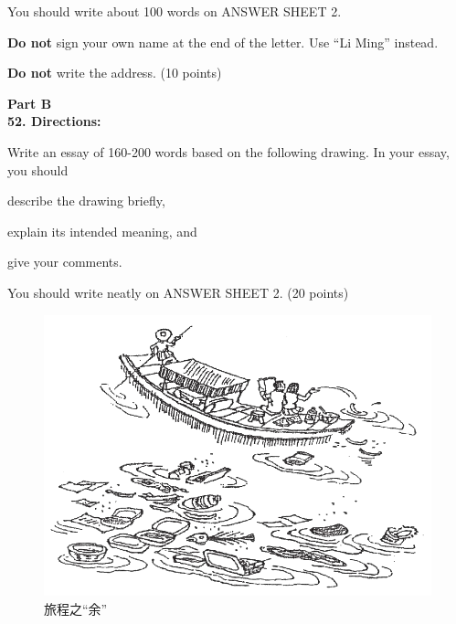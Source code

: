You should write about 100 words on ANSWER SHEET 2.

\textbf{Do not} sign your own name at the end of the letter. Use ``Li
Ming'' instead.

\textbf{Do not} write the address. (10 points)



\vspace{2em}

\noindent
\textbf{Part B}\\
\textbf{52. Directions:}

Write an essay of 160-200 words based on the following drawing. In your
essay, you should
\begin{listwrite}
	\item
 describe the drawing briefly,

\item 
 explain its intended meaning, and

\item 
 give your comments.
\end{listwrite}

You should write neatly on ANSWER SHEET 2. (20 points)

\begin{figure}[h!]
	\centering
	\includegraphics[width=0.54\linewidth]{picture/2011.png}
	\caption*{旅程之“余”}
\end{figure}

